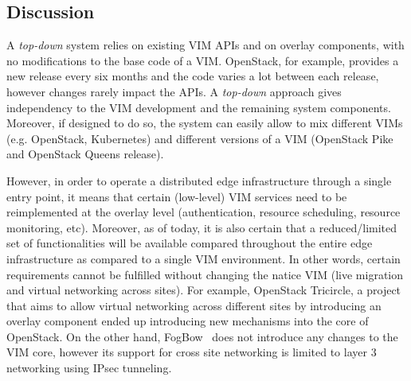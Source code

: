 


\subsection{Discussion}
\label{sec:design_discussion}


A \emph{top-down} system  relies on existing VIM APIs and on overlay components, with no modifications to the base code of a VIM.
OpenStack, for example, provides a new release every six months and the code varies a lot between each release, however changes rarely impact the APIs. A \emph{top-down} approach gives independency to the VIM development and the remaining system components. Moreover, if designed to do so, the system can easily allow to mix different VIMs (e.g. OpenStack, Kubernetes) and different versions of a VIM (\eg OpenStack Pike and OpenStack Queens release). 

However, in order to operate a distributed edge infrastructure through a single entry point, it means that certain (low-level) VIM services need to be reimplemented at the overlay level (\eg authentication, resource scheduling, resource monitoring, etc). 
Moreover, as of today, it is also certain that a reduced/limited set of functionalities will be available compared throughout the entire edge infrastructure as compared to a single VIM environment. In other words, certain requirements cannot be fulfilled without changing the natice VIM (\eg live migration and virtual networking across sites). For example, OpenStack Tricircle, a project that aims to allow virtual networking across different sites by introducing an overlay component ended up introducing new mechanisms into the core of OpenStack. On the other hand, FogBow~\cite{brasileiro2016fogbow} does not introduce any changes to the VIM core, however its support for cross site networking is limited to layer 3 networking using IPsec tunneling.



